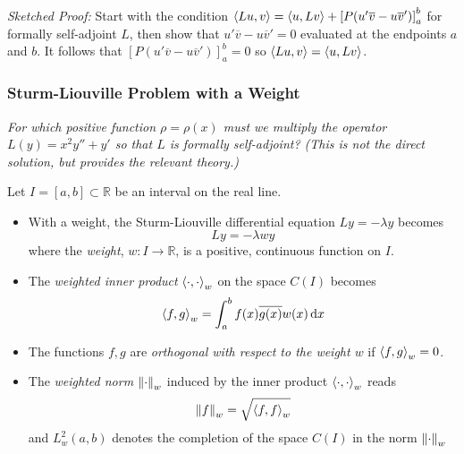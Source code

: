\documentclass[11pt, a4paper]{article}
\newcommand{\question}[1]{\textit{#1}\vspace{2mm}}
\newcommand{\R}{\mathbb{R}} %
\newcommand{\diff}{\mathop{}\!\mathrm{d}} %
\begin{document}
\begin{itemize}
	\textit{Sketched Proof:} Start with the condition $ \expval{Lu, v} = \expval{u, Lv} + \left[P(u'\overline{v} - u \overline{v}') \right]_{a}^{b} $ for formally self-adjoint $ L $, then show that $ u'\overline{v} - u \overline{v}' = 0 $ evaluated at the endpoints $ a $ and $ b $. It follows that $ \left[P(u'\overline{v} - u \overline{v}') \right]_{a}^{b} = 0 $ so  $ \expval{Lu, v} = \expval{u, Lv} $.
		
\end{itemize}


\subsubsection{Sturm-Liouville Problem with a Weight}
\question{For which positive function $ \rho = \rho(x) $ must we multiply the operator $ L(y) = x^{2}y'' + y' $ so that $ L $ is formally self-adjoint? (This is not the direct solution, but provides the relevant theory.)}

Let $ I = [a, b] \subset \R $ be an interval on the real line.
\begin{itemize}
	\item With a weight, the Sturm-Liouville differential equation $ Ly = -\lambda y $ becomes
	\begin{equation*}
		Ly = -\lambda w y
	\end{equation*}
	where the \textit{weight}, $ w: I \to \R $, is a positive, continuous function on $ I $.
	
	\item The \textit{weighted inner product} $ \expval{\cdot, \cdot}_{w} $ on the space $ C(I) $ becomes
	\begin{equation*}
		\expval{f, g}_{w} = \int_{a}^{b} f(x)\overline{g(x)} w(x) \diff x
	\end{equation*}
	
	\item The functions $ f, g $ are \textit{orthogonal with respect to the weight $ w $} if $ \expval{f, g}_{w} = 0 $.
	
	\item The \textit{weighted norm} $ \norm{\cdot}_{w} $ induced by the inner product $ \expval{\cdot, \cdot}_{w} $ reads
	\begin{equation*}
		\norm{f}_{w} = \sqrt{\expval{f, f}_{w}}
	\end{equation*}
	and $ L_{w}^{2}(a, b) $ denotes the completion of the space $ C(I) $ in the norm $ \norm{\cdot}_{w} $
	
\end{itemize}
\end{document}
